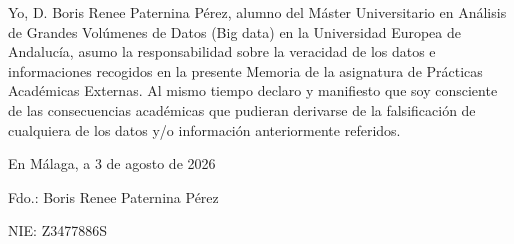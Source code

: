 \clearpage
\thispagestyle{plain}
{}
\vspace*{2cm}

\noindent
Yo, D. Boris Renee Paternina Pérez, alumno del
Máster Universitario en Análisis de Grandes Volúmenes de Datos (Big
data) en la Universidad Europea de Andalucía, asumo la responsabilidad
sobre la veracidad de los datos e informaciones recogidos en la
presente Memoria de la asignatura de Prácticas Académicas Externas. Al
mismo tiempo declaro y manifiesto que soy consciente de las
consecuencias académicas que pudieran derivarse de la falsificación de
cualquiera de los datos y/o información anteriormente referidos.

\vspace{1.5cm}
\noindent
En Málaga, a 3 de agosto de 2026

\vspace{7cm}
\noindent
Fdo.: Boris Renee Paternina Pérez

\vspace{0.5cm}
\noindent
NIE: Z3477886S